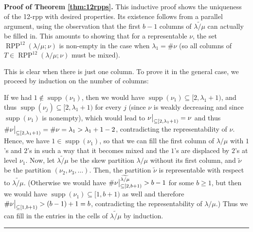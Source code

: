 \documentclass[numbers=enddot,12pt,final,onecolumn,notitlepage]{scrartcl}%
\theoremstyle{definition}
\newenvironment{proof}[1][Proof]{\noindent\textbf{#1.} }{\ \rule{0.5em}{0.5em}}
\def\seplistvar{{{\nu}}} %
\def\supp{{\operatorname{supp}}}
\def\lm{{\lambda/\mu}}
\def\OneTwoRPPCutvar{{\operatorname{RPP}^{12}\left(  \lambda/\mu ;\seplistvar \right)}}
\begin{document}
\begin{proof}[Proof of Theorem \ref{thm:12rpps}]
This inductive proof shows the uniqueness of the 12-rpp with desired properties. Its existence follows from a parallel argument, using the observation that the first $b-1$ columns of $\widetilde{\lm}$ can actually be filled in. This amounts to showing that for a representable $\seplistvar$, the set $\OneTwoRPPCutvar$ is non-empty in the case when $\lambda_1 = \#\seplistvar$ (so all columns of $T \in \OneTwoRPPCutvar$ must be mixed).

This is clear when there is just one column. To prove it in the general case, we proceed by induction on the number of columns:

If we had $1 \notin \supp(\seplistvar_1)$, then we would have $\supp(\seplistvar_1) \subseteq [2, \lambda_1+1)$, and thus $\supp(\seplistvar_j) \subseteq [2, \lambda_1+1)$ for every $j$ (since $\seplistvar$ is weakly decreasing and since $\supp(\seplistvar_1)$ is nonempty), which would lead to $\nuxy{2}{\lambda_1+1} = \seplistvar$ and thus $\#\nuxy{2}{\lambda_1+1} = \#\seplistvar = \lambda_1 > \lambda_1 + 1 - 2$, contradicting the representability of $\seplistvar$. Hence, we have $1 \in \supp(\seplistvar_1)$, so that we can fill the first column of $\lm$ with $1$'s and $2$'s in such a way that it becomes mixed and the $1$'s are displaced by $2$'s at level $\seplistvar_1$. Now, let $\widetilde{\lm}$ be the skew partition $\lm$ without its first column, and $\widetilde{\seplistvar}$ be the partition $\left(\seplistvar_2, \seplistvar_3, \ldots\right)$. Then, the partition $\widetilde{\seplistvar}$ is representable with respect to $\widetilde{\lm}$. (Otherwise we would have $\#\nuxy{2}{b+1}^{\widetilde{\lm}}>b-1$ for some $b \geq 1$, but then we would have $\supp(\seplistvar_1) \subseteq [1,b+1)$ as well and therefore $\#\nuxy{1}{b+1}>(b-1)+1=b$, contradicting the representability of $\lm$.) Thus we can fill in the entries in the cells of $\widetilde{\lm}$ by induction.
\end{proof}
\end{document}

